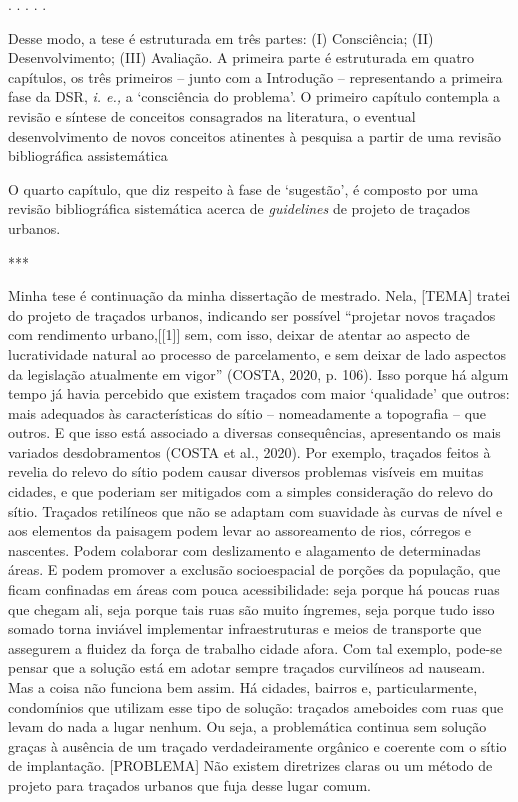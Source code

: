 \documentclass[]{report}
\begin{document}
	\begin{center}
		. . . . .
	\end{center}

	Desse modo, a tese é estruturada em três partes: (I) Consciência; (II) Desenvolvimento; (III) Avaliação. A primeira parte é estruturada em quatro capítulos, os três primeiros – junto com a Introdução – representando a primeira fase da DSR, \textit{i. e.,} a `consciência do problema'. O primeiro capítulo contempla a revisão e síntese de conceitos consagrados na literatura, o eventual desenvolvimento de novos conceitos atinentes à pesquisa a partir de uma revisão bibliográfica assistemática

	O quarto capítulo, que diz respeito à fase de `sugestão', é composto por uma revisão bibliográfica sistemática acerca de \textit{guidelines} de projeto de traçados urbanos.

	***

		

	Minha tese é continuação da minha dissertação de mestrado. Nela, [TEMA] tratei do projeto de traçados urbanos, indicando ser possível “projetar novos traçados com rendimento urbano,[[1]] sem, com isso, deixar de atentar ao aspecto de lucratividade natural ao processo de parcelamento, e sem deixar de lado aspectos da legislação atualmente em vigor” (COSTA, 2020, p. 106). Isso porque há algum tempo já havia percebido que existem traçados com maior ‘qualidade’ que outros: mais adequados às características do sítio – nomeadamente a topografia – que outros. E que isso está associado a diversas consequências, apresentando os mais variados desdobramentos (COSTA et al., 2020). Por exemplo, traçados feitos à revelia do relevo do sítio podem causar diversos problemas visíveis em muitas cidades, e que poderiam ser mitigados com a simples consideração do relevo do sítio. Traçados retilíneos que não se adaptam com suavidade às curvas de nível e aos elementos da paisagem podem levar ao assoreamento de rios, córregos e nascentes. Podem colaborar com deslizamento e alagamento de determinadas áreas. E podem promover a exclusão socioespacial de porções da população, que ficam confinadas em áreas com pouca acessibilidade: seja porque há poucas ruas que chegam ali, seja porque tais ruas são muito íngremes, seja porque tudo isso somado torna inviável implementar infraestruturas e meios de transporte que assegurem a fluidez da força de trabalho cidade afora. Com tal exemplo, pode-se pensar que a solução está em adotar sempre traçados curvilíneos ad nauseam. Mas a coisa não funciona bem assim. Há cidades, bairros e, particularmente, condomínios que utilizam esse tipo de solução: traçados ameboides com ruas que levam do nada a lugar nenhum. Ou seja, a problemática continua sem solução graças à ausência de um traçado verdadeiramente orgânico e coerente com o sítio de implantação. [PROBLEMA] Não existem diretrizes claras ou um método de projeto para traçados urbanos que fuja desse lugar comum.
\end{document}
